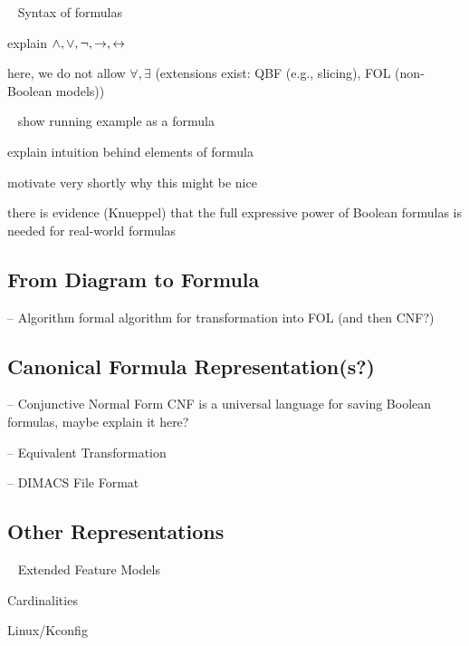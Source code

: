 \begin{frame}{~}
    Syntax of formulas

    explain $\wedge, \vee, \neg, \rightarrow, \leftrightarrow$

    here, we do not allow $\forall, \exists$ (extensions exist: QBF (e.g., slicing), FOL (non-Boolean models))
\end{frame}

\begin{frame}{~}
    show running example as a formula
    
    explain intuition behind elements of formula

    motivate very shortly why this might be nice

    there is evidence (Knueppel) that the full expressive power of Boolean formulas is needed for real-world formulas
\end{frame}

\subsection{From Diagram to Formula}

\begin{frame}{-- Algorithm}
    formal algorithm for transformation into FOL (and then CNF?)
\end{frame}

\subsection{Canonical Formula Representation(s?)}

\begin{frame}{-- Conjunctive Normal Form}
    CNF is a universal language for saving Boolean formulas, maybe explain it here?
\end{frame}

\begin{frame}{-- Equivalent Transformation}
    
\end{frame}

\begin{frame}{-- DIMACS File Format}
    
\end{frame}


\subsection{Other Representations} %

\begin{frame}{~}
    Extended Feature Models
    

    Cardinalities

    Linux/Kconfig %
\end{frame}
